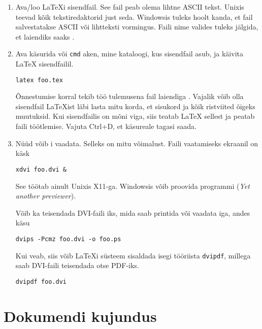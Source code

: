 {\begin{enumerate}
\item

Ava/loo \LaTeX i sisendfail. See fail peab olema lihtne ASCII tekst.
Unixis teevad kõik tekstiredaktorid just seda. Windowsis tuleks hoolt
kanda, et fail salvestatakse ASCII või lihtteksti vormingus. Faili nime
valides tuleks jälgida, et laiendiks saaks .

\item

Ava käsurida või \texttt{cmd} aken, mine kataloogi, kus sisendfail asub,
ja käivita \LaTeX{} sisendfailil.
\begin{lscommand}
\verb+latex foo.tex+
\end{lscommand}
Õnnestumise korral tekib töö tulemusena fail laiendiga .
Vajalik võib olla sisendfail \LaTeX ist läbi lasta mitu korda, et
sisukord ja kõik ristviited õigeks muutuksid. Kui sisendfailis on mõni
viga, siis teatab \LaTeX{} sellest ja peatab faili töötlemise. Vajuta
Ctrl+D, et käsureale tagasi saada.

\item

Nüüd võib i vaadata. Selleks on mitu võimalust. Faili
vaatamiseks ekraanil on käsk
\begin{lscommand}
\verb+xdvi foo.dvi &+
\end{lscommand}
See töötab ainult Unixis X11-ga. Windowsis võib proovida programmi
 (\emph{Yet another previewer}).

Võib ka teisendada DVI-faili \PSi iks, mida saab printida või vaadata
iga, andes
käsu
\begin{lscommand}
\verb+dvips -Pcmz foo.dvi -o foo.ps+
\end{lscommand}

Kui veab, siis võib \LaTeX i süsteem sisaldada isegi tööriista
\texttt{dvipdf}, millega saab DVI-faili
teisendada otse PDF-iks.
\begin{lscommand}
\verb+dvipdf foo.dvi+
\end{lscommand}

\end{enumerate}

\section{Dokumendi kujundus}

}
